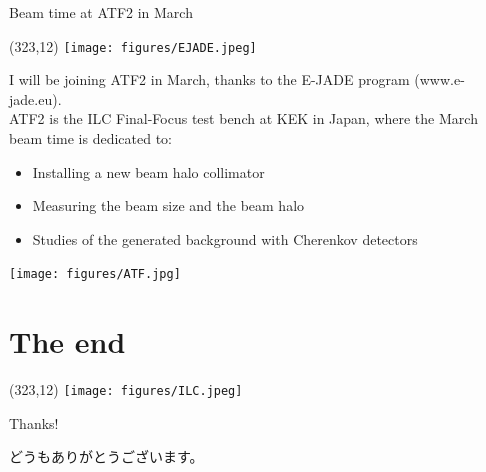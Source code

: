 \documentclass[xcolor={dvipsnames}]{beamer}
\newcommand{\ilclogo}{
  \setlength{\TPHorizModule}{1pt}
  \setlength{\TPVertModule}{1pt}
  \begin{textblock}{1}(323,12)
   \texttt{[image: figures/ILC.jpeg]}
  \end{textblock}
}
\newcommand{\ejadelogo}{
  \setlength{\TPHorizModule}{1pt}
  \setlength{\TPVertModule}{1pt}
  \begin{textblock}{1}(323,12)
   \texttt{[image: figures/EJADE.jpeg]}
  \end{textblock}
}
\begin{document}
\begin{frame}{Beam time at ATF2 in March}
\ejadelogo
I will be joining ATF2 in March, thanks to the E-JADE program {\tiny(www.e-jade.eu)}.\\
\vspace*{0.3cm}
ATF2 is the ILC Final-Focus test bench at KEK in Japan, where the March beam time is dedicated to:
\begin{itemize}
\item Installing a new beam halo collimator
\item Measuring the beam size and the beam halo
\item Studies of the generated background with Cherenkov detectors
\end{itemize}
\begin{center}
 	\texttt{[image: figures/ATF.jpg]}
\end{center}

\end{frame}

\section*{The end}
{
\begin{frame}
\ilclogo
\begin{center}
\textcolor{RubineRed}{
	\LARGE Thanks!\\
	\vspace*{0.5cm}
	\begin{CJK}{UTF8}{min}
	どうもありがとうございます。
	\end{CJK}
}
\end{center}
\end{frame}
}
\end{document}

